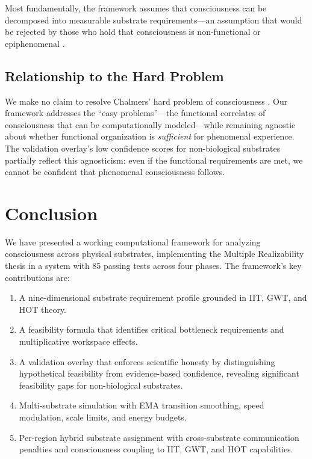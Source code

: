 \documentclass[12pt,a4paper]{article}
\begin{document}
Most fundamentally, the framework assumes that consciousness can be decomposed into measurable substrate requirements---an assumption that would be rejected by those who hold that consciousness is non-functional or epiphenomenal \citep{chalmers2010character}.

\subsection{Relationship to the Hard Problem}

We make no claim to resolve Chalmers' hard problem of consciousness \citep{chalmers2010character}. Our framework addresses the ``easy problems''---the functional correlates of consciousness that can be computationally modeled---while remaining agnostic about whether functional organization is \emph{sufficient} for phenomenal experience. The validation overlay's low confidence scores for non-biological substrates partially reflect this agnosticism: even if the functional requirements are met, we cannot be confident that phenomenal consciousness follows.

\section{Conclusion}

We have presented a working computational framework for analyzing consciousness across physical substrates, implementing the Multiple Realizability thesis in a system with 85 passing tests across four phases. The framework's key contributions are:

\begin{enumerate}
    \item A nine-dimensional substrate requirement profile grounded in IIT, GWT, and HOT theory.
    \item A feasibility formula that identifies critical bottleneck requirements and multiplicative workspace effects.
    \item A validation overlay that enforces scientific honesty by distinguishing hypothetical feasibility from evidence-based confidence, revealing significant feasibility gaps for non-biological substrates.
    \item Multi-substrate simulation with EMA transition smoothing, speed modulation, scale limits, and energy budgets.
    \item Per-region hybrid substrate assignment with cross-substrate communication penalties and consciousness coupling to IIT, GWT, and HOT capabilities.
\end{enumerate}
\end{document}
